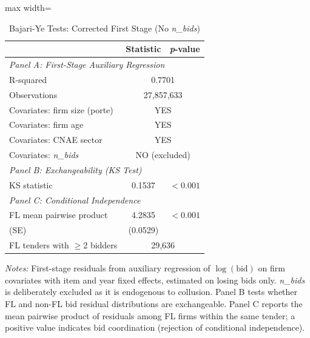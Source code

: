 \begin{table}[htbp]
\centering
\caption{Bajari-Ye Tests: Corrected First Stage (No \textit{n\_bids})}
\label{tab:bajari_ye_corrected}
\begin{adjustbox}{max width=\textwidth}
\begin{threeparttable}
\small
\begin{tabular}{lcc}
\toprule
 & Statistic & \textit{p}-value \\
\midrule
\multicolumn{3}{l}{\textit{Panel A: First-Stage Auxiliary Regression}} \\[3pt]
R-squared & \multicolumn{2}{c}{0.7701} \\
Observations & \multicolumn{2}{c}{27,857,633} \\
Covariates: firm size (porte) & \multicolumn{2}{c}{YES} \\
Covariates: firm age & \multicolumn{2}{c}{YES} \\
Covariates: CNAE sector & \multicolumn{2}{c}{YES} \\
Covariates: \textit{n\_bids} & \multicolumn{2}{c}{NO (excluded)} \\
\midrule
\multicolumn{3}{l}{\textit{Panel B: Exchangeability (KS Test)}} \\[3pt]
KS statistic & 0.1537 & $<0.001$ \\
\midrule
\multicolumn{3}{l}{\textit{Panel C: Conditional Independence}} \\[3pt]
FL mean pairwise product & 4.2835 & $<0.001$ \\
\quad (SE) & (0.0529) & \\
FL tenders with $\geq$2 bidders & \multicolumn{2}{c}{29,636} \\
\bottomrule
\end{tabular}
\begin{tablenotes}
\small
\item \textit{Notes:} First-stage residuals from auxiliary regression of
$\log(\text{bid})$ on firm covariates with item and year fixed effects,
estimated on losing bids only. \textit{n\_bids} is deliberately excluded
as it is endogenous to collusion. Panel B tests whether FL and non-FL bid
residual distributions are exchangeable. Panel C reports the mean pairwise
product of residuals among FL firms within the same tender; a positive value
indicates bid coordination (rejection of conditional independence).
\end{tablenotes}
\end{threeparttable}
\end{adjustbox}
\end{table}
